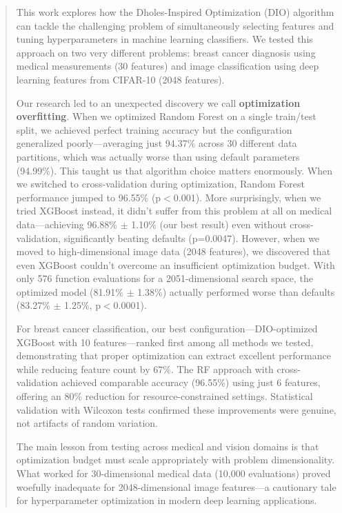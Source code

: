 \documentclass[12pt, a4paper]{article}
\begin{document}
\begin{abstract}
\noindent This work explores how the Dholes-Inspired Optimization (DIO) algorithm can tackle the challenging problem of simultaneously selecting features and tuning hyperparameters in machine learning classifiers. We tested this approach on two very different problems: breast cancer diagnosis using medical measurements (30 features) and image classification using deep learning features from CIFAR-10 (2048 features).

Our research led to an unexpected discovery we call \textbf{optimization overfitting}. When we optimized Random Forest on a single train/test split, we achieved perfect training accuracy but the configuration generalized poorly—averaging just 94.37\% across 30 different data partitions, which was actually worse than using default parameters (94.99\%). This taught us that algorithm choice matters enormously. When we switched to cross-validation during optimization, Random Forest performance jumped to 96.55\% (p$<$0.001). More surprisingly, when we tried XGBoost instead, it didn't suffer from this problem at all on medical data—achieving 96.88\% $\pm$ 1.10\% (our best result) even without cross-validation, significantly beating defaults (p=0.0047). However, when we moved to high-dimensional image data (2048 features), we discovered that even XGBoost couldn't overcome an insufficient optimization budget. With only 576 function evaluations for a 2051-dimensional search space, the optimized model (81.91\% $\pm$ 1.38\%) actually performed worse than defaults (83.27\% $\pm$ 1.25\%, p$<$0.0001).

For breast cancer classification, our best configuration—DIO-optimized XGBoost with 10 features—ranked first among all methods we tested, demonstrating that proper optimization can extract excellent performance while reducing feature count by 67\%. The RF approach with cross-validation achieved comparable accuracy (96.55\%) using just 6 features, offering an 80\% reduction for resource-constrained settings. Statistical validation with Wilcoxon tests confirmed these improvements were genuine, not artifacts of random variation.

The main lesson from testing across medical and vision domains is that optimization budget must scale appropriately with problem dimensionality. What worked for 30-dimensional medical data (10,000 evaluations) proved woefully inadequate for 2048-dimensional image features—a cautionary tale for hyperparameter optimization in modern deep learning applications.
\end{abstract}
\end{document}
